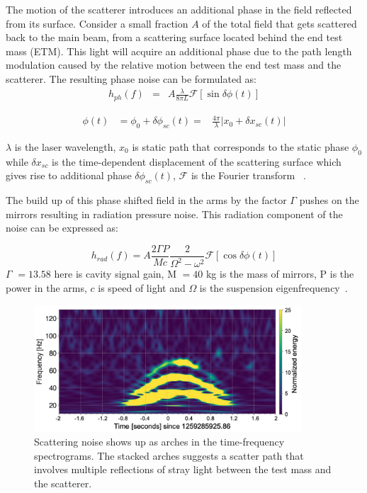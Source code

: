\documentclass[12pt]{iopart}
\begin{document}
The motion of the scatterer introduces an additional phase in the field reflected from its surface. Consider a small fraction $A$ of the total field that gets scattered back to the main beam, from a scattering surface located behind the end test mass (ETM). This light will acquire an additional phase  due to the path length modulation caused by the relative motion between the end test mass and the scatterer. The resulting phase noise can be formulated as:
\begin{eqnarray}
      h_{ph}(f) & = & A\frac{{\lambda}}{8{\pi}L}\mathcal{F}\left[\sin{\delta{\phi}(t)}\right] \label{eq:1}
\end{eqnarray}

\begin{eqnarray}
    {\phi}(t) & = {\phi}_{0} + {\delta\phi_{sc}(t)} = & \frac{4{\pi}}{{\lambda}}\left|{ x_{0} + {\delta} x_{sc}(t)}\right| \label{eq:2}
\end{eqnarray}
    
${\lambda}$ is the laser wavelength, $x_{0}$ is static path that corresponds to the static phase $\phi_{0}$ while  $\delta x_{sc}$ is the time-dependent displacement of the scattering surface which gives rise to additional phase $\delta \phi_{sc}(t)$, 
$\mathcal{F}$ is the Fourier transform ~\cite{Accadia:2010zzb,Canuel:13,vajente_chapter}. 
\par
The build up of this phase shifted field in the arms by the factor ${\Gamma}$ pushes on the mirrors resulting in radiation pressure noise. This radiation component of the noise can be expressed as:


\begin{equation}
    h_{rad}(f) = A\frac{2{\Gamma P}}{Mc}\frac{2}{\Omega^2 - \omega^2} \mathcal{F}\left[\cos{\delta{\phi}(t)}\right] \label{rad_eqn}
\end{equation}
${\Gamma}$ $= 13.58$ here is cavity signal gain, M $= 40$ kg is the mass of mirrors, P is the power in the arms, $c$ is speed of light and ${\Omega}$ is the suspension eigenfrequency~\cite{Ottaway:12}.
\begin{figure}[h]
    \centering
    \includegraphics[width=10cm]{scatindarmlrs1.png}
    \caption{Scattering noise shows up as arches in the time-frequency spectrograms. The stacked arches suggests a scatter path that involves multiple reflections of stray light between the test mass and the scatterer.}
    \label{fig:scat}
\end{figure}
\end{document}
